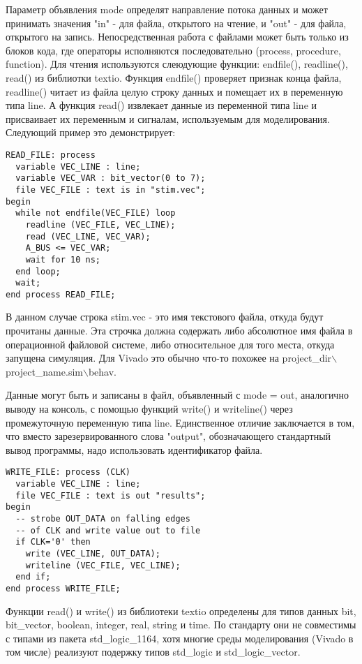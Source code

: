 Параметр объявления mode определят направление потока данных и может принимать значения "in" - для файла, открытого на чтение, и "out" - для файла, открытого на запись. Непосредственная работа с файлами может быть только из блоков кода, где операторы исполняются последовательно (process, procedure, function). Для чтения используются слеюдующие функции: endfile(), readline(), read() из библиотки textio. Функция endfile() проверяет признак конца файла, readline() читает из файла целую строку данных и помещает их в переменную типа line. А функция read() извлекает данные из переменной типа line и присваивает их переменным и сигналам, используемым для моделирования. Следующий пример это демонстрирует:

\begin{lstlisting}
READ_FILE: process
  variable VEC_LINE : line;
  variable VEC_VAR : bit_vector(0 to 7);
  file VEC_FILE : text is in "stim.vec";
begin
  while not endfile(VEC_FILE) loop
    readline (VEC_FILE, VEC_LINE);
    read (VEC_LINE, VEC_VAR);
    A_BUS <= VEC_VAR;
    wait for 10 ns;
  end loop;
  wait;
end process READ_FILE;
\end{lstlisting}

В данном случае строка stim.vec - это имя текстового файла, откуда будут прочитаны данные. Эта строчка должна содержать либо абсолютное имя файла в операционной файловой системе, либо относительное для того места, откуда запущена симуляция. Для Vivado это обычно что-то похожее на project\_dir$\backslash$project\_name.sim$\backslash$behav.

Данные могут быть и записаны в файл, объявленный с mode =  out, аналогично выводу на консоль, с помощью функций write() и writeline() через промежуточную переменную типа line. Единственное отличие заключается в том, что вместо зарезервированного слова "output", обозначающего стандартный вывод программы, надо использовать идентификатор файла. 

\begin{lstlisting}
WRITE_FILE: process (CLK)
  variable VEC_LINE : line;
  file VEC_FILE : text is out "results";
begin
  -- strobe OUT_DATA on falling edges 
  -- of CLK and write value out to file
  if CLK='0' then
    write (VEC_LINE, OUT_DATA);
    writeline (VEC_FILE, VEC_LINE);
  end if; 
end process WRITE_FILE;
\end{lstlisting}

Функции read() и write() из библиотеки textio определены для типов данных bit, bit\_vector, boolean, integer, real, string и time. По стандарту они не совместимы с типами из пакета std\_logic\_1164, хотя многие среды моделирования (Vivado в том числе) реализуют подержку типов std\_logic и std\_logic\_vector. 